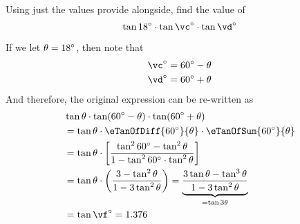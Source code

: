 
\va\vc
{}\va\vd
{}\vf

\question[4] Using just the values provide alongside, find the value of  
\[ \tan\va^\circ\cdot\tan\vc^\circ\cdot\tan\vd^\circ \]


\watchout
\begin{solution}[\halfpage]
  If we let $\theta=18^\circ$, then note that 
  \begin{align}
    \vc^\circ &= 60^\circ-\theta \\
    \vd^\circ &= 60^\circ+\theta
  \end{align}
  And therefore, the original expression can be re-written as 
  \begin{align}
    &\tan\theta\cdot\tan(60^\circ-\theta)\cdot\tan(60^\circ+\theta) \\
    &=\tan\theta\cdot\eTanOfDiff{60^\circ}{\theta}\cdot\eTanOfSum{60^\circ}{\theta} \\
    &= \tan\theta\cdot\left[ \dfrac{\tan^260^\circ-\tan^2\theta}{1-\tan^260^\circ\cdot\tan^2\theta} \right] \\
    &= \tan\theta\cdot\left( \dfrac{3-\tan^2\theta}{1-3\tan^2\theta}\right) 
    = \underbrace{\dfrac{3\tan\theta-\tan^3\theta}{1-3\tan^2\theta}}_{=\tan 3\theta} \\
    &= \tan{\vf^\circ}=\vg
  \end{align}
\end{solution}
